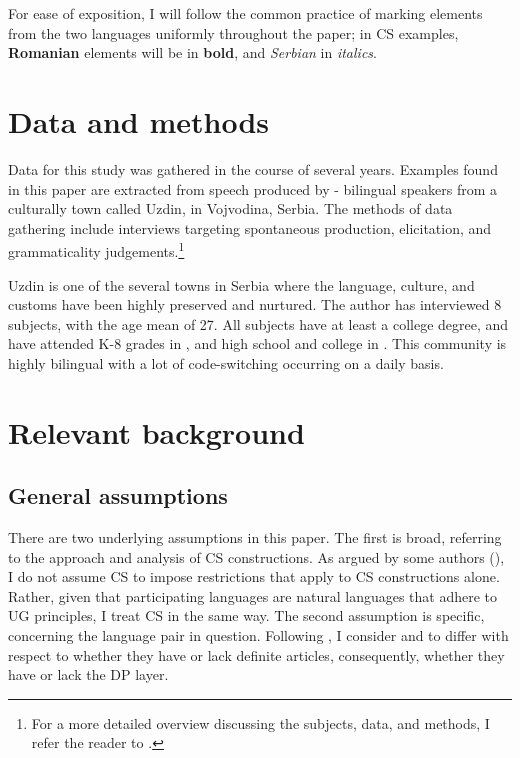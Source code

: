 \documentclass[output=paper,hidelinks,newtxmath,]{langscibook}
\begin{document}
For ease of exposition, I will follow the common practice of marking elements from the two languages uniformly throughout the paper; in CS examples, \textbf{Romanian} elements will be in \textbf{bold}, and \textit{Serbian} in \textit{italics}.

\section{Data and methods}\label{15:s2}

Data for this study was gathered in the course of several years. Examples found in this paper are extracted from speech produced by - bilingual speakers from a culturally  town called Uzdin, in Vojvodina, Serbia. The methods of data gathering include interviews targeting spontaneous production, elicitation, and grammaticality judgements.\footnote{For a more detailed overview discussing the subjects, data, and methods, I refer the reader to \citet{Petroj}.} 

Uzdin is one of the several towns in Serbia where the  language, culture, and customs have been highly preserved and nurtured. The author has interviewed 8 subjects, with the age mean of 27. All subjects have at least a college degree, and have attended K-8 grades in , and high school and college in . This  community is highly bilingual with a lot of code-switching occurring on a daily basis.

\section{Relevant background}\label{15:s3}
\subsection{General assumptions}\label{15:s3.1}

There are two underlying assumptions in this paper. The first is broad, referring to the approach and analysis of CS constructions. As argued by some authors (\citealt{GonzalesVelasquez1995,Bhatia-Ritchie1996,denDikken2011,BandiRao-denDikken2014}), I do not assume CS to impose restrictions that apply to CS constructions alone. Rather, given that participating languages are natural languages that adhere to UG principles, I treat CS in the same way. The second assumption is specific, concerning the language pair in question. Following \citet{Boskovic2008,Boskovic2012}, I consider  and  to differ with respect to whether they have or lack definite articles, consequently, whether they have or lack the DP layer.
\end{document}
